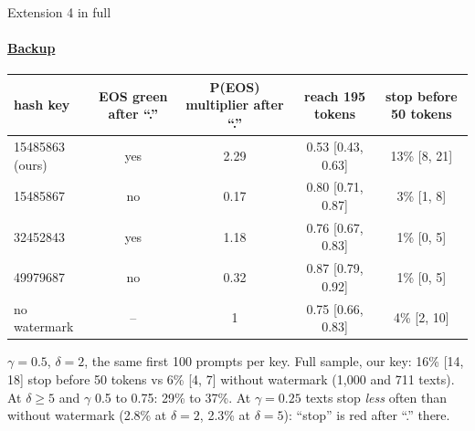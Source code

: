 \documentclass[aspectratio=169,10pt,t]{beamer}
\begin{document}
\begin{frame}[label=b20]{Extension 4 in full}
  \framesubtitle{\hyperlink{b0}{Backup}}
  \small
  \begin{center}
  \begin{tabular}{@{}lcccc@{}}
    \toprule
    hash key & EOS green after ``.'' & P(EOS) multiplier after ``.'' & reach 195 tokens & stop before 50 tokens \\
    \midrule
    15485863 (ours) & yes & 2.29 & 0.53 [0.43, 0.63] & 13\% [8, 21] \\
    15485867 & no & 0.17 & 0.80 [0.71, 0.87] & 3\% [1, 8] \\
    32452843 & yes & 1.18 & 0.76 [0.67, 0.83] & 1\% [0, 5] \\
    49979687 & no & 0.32 & 0.87 [0.79, 0.92] & 1\% [0, 5] \\
    no watermark & -- & 1 & 0.75 [0.66, 0.83] & 4\% [2, 10] \\
    \bottomrule
  \end{tabular}
  \end{center}
  \vspace{0.3em}
  $\gamma = 0.5$, $\delta = 2$, the same first 100 prompts per key. Full sample, our key: 16\% [14, 18] stop before 50 tokens vs 6\% [4, 7] without watermark (1{,}000 and 711 texts). At $\delta \ge 5$ and $\gamma$ 0.5 to 0.75: 29\% to 37\%. At $\gamma = 0.25$ texts stop \emph{less} often than without watermark (2.8\% at $\delta = 2$, 2.3\% at $\delta = 5$): ``stop'' is red after ``.'' there.
\end{frame}
\end{document}
